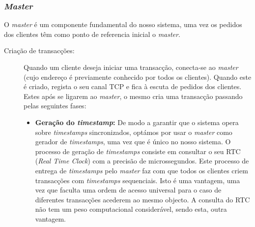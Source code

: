 \subsubsection{\textit{Master}}
O \textit{master} é um componente fundamental do nosso sistema, uma vez os pedidos dos clientes têm como ponto de referencia  inicial o \textit{master}.
\begin{description}

\item[Criação de transacções: ]
 Quando um cliente deseja iniciar uma transacção, conecta-se ao \textit{master} (cujo endereço é previamente conhecido por todos os clientes). Quando este é criado, regista o seu canal TCP e fica à escuta de pedidos dos clientes. Estes após se ligarem ao \textit{master}, o mesmo cria uma transacção passando pelas seguintes fases:
\begin{itemize}

\item \textbf{Geração do \textit{timestamp}:} De modo a  garantir que o sistema opera sobre \textit{timestamps} sincronizados, optámos por usar o \textit{master} como gerador de \textit{timestamps}, uma vez que é único no nosso sistema. O processo de geração de \textit{timestamps} consiste em consultar o seu RTC (\textit{Real Time Clock}) com a precisão de microssegundos. Este processo de entrega de \textit{timestamps} pelo \textit{master} faz com que todos os clientes criem transacções com \textit{timestamps} sequenciais. Isto é uma vantagem, uma vez que faculta uma ordem de acesso universal para o caso de diferentes transacções acederem ao mesmo objecto. A consulta do RTC não tem um peso computacional considerável, sendo esta, outra vantagem.


\end{itemize}
\end{description}
